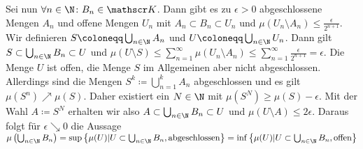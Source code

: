 \documentclass{article}
\begin{document}
    Sei nun $\forall n \in \N\colon B_n\in \mathscr K$. Dann gibt es zu $\epsilon > 0$ abgeschlossene Mengen $A_n$ und offene Mengen $U_n$ mit $A_n \subset B_n \subset U_n$ und $\mu(U_n \setminus A_n) \leq \frac{\epsilon}{2^{n+1}}$. Wir definieren $S \coloneqq \bigcup_{n\in \N} A_n$ und $U \coloneqq \bigcup_{n\in \N} U_n$. Dann gilt $S \subset \bigcup_{n\in \N} B_n \subset U$ und $\mu(U\setminus S)  \le \sum_{n = 1}^{\infty} \mu(U_n\setminus A_n) \leq \sum_{n = 1}^{\infty} \frac{\epsilon}{2^{n+1}} = \epsilon$. Die Menge $U$ ist offen, die Menge $S$ im Allgemeinen aber nicht abgeschlossen. Allerdings sind die Mengen $S^k \coloneqq \bigcup_{n=1}^k A_n$ abgeschlossen und es gilt $\mu(S^n) \nearrow \mu(S)$. Daher existiert ein $N\in \N$ mit $\mu(S^N) \geq \mu(S) - \epsilon$. Mit der Wahl $A \coloneqq S^N$ erhalten wir also $A \subset \bigcup_{n\in \N} B_n \subset U$ und $\mu(U\setminus A) \leq 2\epsilon$. Daraus folgt für $\epsilon \searrow 0$ die Aussage $\mu\left(\bigcup_{n\in \N} B_n\right) = \sup \left\{\mu(U) | U \subset \bigcup_{n\in \N} B_n, \text{abgeschlossen}\right\} = \inf \left\{\mu(U) | U \subset \bigcup_{n\in \N} B_n, \text{offen}\right\}$
\end{document}
